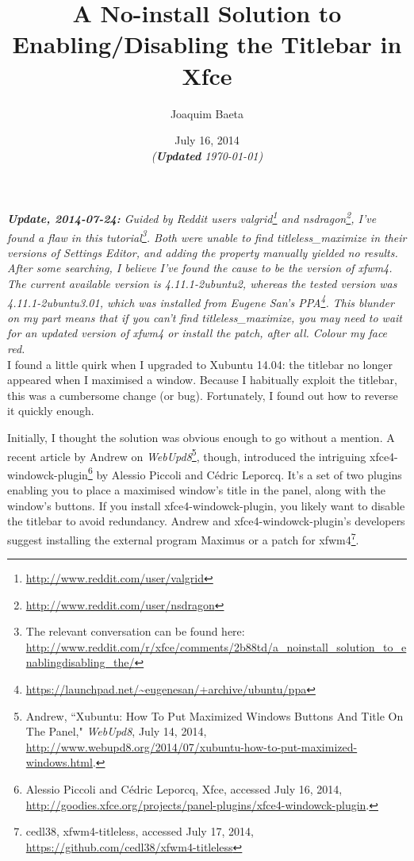 \documentclass[12pt, a4paper]{article}
\title{\textbf{A No-install Solution to Enabling/Disabling the Titlebar in Xfce}}
\author{Joaquim Baeta}
\date{July 16, 2014\\ \normalsize \emph{(\textbf{Updated} \today)}}
\begin{document}
\maketitle

\noindent \emph{\textbf{Update, 2014-07-24:} Guided by Reddit users valgrid\footnote{\url{http://www.reddit.com/user/valgrid}} and nsdragon\footnote{\url{http://www.reddit.com/user/nsdragon}}, I've found a flaw in this tutorial\footnote{The relevant conversation can be found here: \url{http://www.reddit.com/r/xfce/comments/2b88td/a_noinstall_solution_to_enablingdisabling_the/}}. Both were unable to find titleless\_maximize in their versions of Settings Editor, and adding the property manually yielded no results. After some searching, I believe I've found the cause to be the version of xfwm4. The current available version is 4.11.1-2ubuntu2, whereas the tested version was 4.11.1-2ubuntu3.01, which was installed from Eugene San's PPA\footnote{\url{https://launchpad.net/~eugenesan/+archive/ubuntu/ppa}}. This blunder on my part means that if you can't find titleless\_maximize, you may need to wait for an updated version of xfwm4 or install the patch, after all. Colour my face red.} \\

\noindent I found a little quirk when I upgraded to Xubuntu 14.04: the titlebar no longer appeared when I maximised a window. Because I habitually exploit the titlebar, this was a cumbersome change (or bug). Fortunately, I found out how to reverse it quickly enough.

Initially, I thought the solution was obvious enough to go without a mention. A recent article by Andrew on \emph{WebUpd8}\footnote{Andrew, ``Xubuntu: How To Put Maximized Windows Buttons And Title On The Panel," \emph{WebUpd8}, July 14, 2014,  \url{http://www.webupd8.org/2014/07/xubuntu-how-to-put-maximized-windows.html}.}, though, introduced the intriguing xfce4-windowck-plugin\footnote{Alessio Piccoli and Cédric Leporcq, Xfce, accessed July 16, 2014, \url{http://goodies.xfce.org/projects/panel-plugins/xfce4-windowck-plugin}.} by Alessio Piccoli and Cédric Leporcq. It's a set of two plugins enabling you to place a maximised window's title in the panel, along with the window's buttons. If you install xfce4-windowck-plugin, you likely want to disable the titlebar to avoid redundancy. Andrew and xfce4-windowck-plugin's developers suggest installing the external program Maximus or a patch for xfwm4\footnote{cedl38, xfwm4-titleless, accessed July 17, 2014, \url{https://github.com/cedl38/xfwm4-titleless}}.
\end{document}
